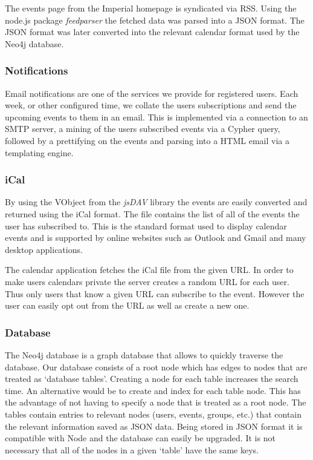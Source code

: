 \documentclass[11pt]{article}
\begin{document}
The events page from the Imperial homepage is syndicated via RSS. Using the node.js package \textit{feedparser} the fetched data was parsed into a JSON format. The JSON format was later converted into the relevant calendar format used by the Neo4j database.

\subsubsection{Notifications}
Email notifications are one of the services we provide for registered users. Each week, or other configured time, we collate the users subscriptions and send the upcoming events to them in an email. This is implemented via a connection to an SMTP server, a mining of the users subscribed events via a Cypher query, followed by a prettifying on the events and parsing into a HTML email via a templating engine.


\subsubsection{iCal}

By using the VObject from the \textit{jsDAV} library the events are easily converted and returned using the iCal format. The file contains the list of all of the events the user has subscribed to. This is the standard format used to display calendar events and is supported by online websites such as Outlook and Gmail and many desktop applications.

The calendar application fetches the iCal file from the given URL. In order to make users calendars private the server creates a random URL for each user. Thus only users that know a given URL can subscribe to the event. However the user can easily opt out from the URL as well as create a new one.

\subsubsection{Database}

The Neo4j database is a graph database that allows to quickly traverse the database.
Our database consists of a root node which has edges to nodes that are treated as `database tables'.
Creating a node for each table increases the search time. An alternative would be to create and index for each table node. This has the advantage of not having to specify a node that is treated as a root node.
The tables contain entries to relevant nodes (users, events, groups, etc.) that contain the relevant information saved as JSON data. Being stored in JSON format it is compatible with Node and the database can easily be upgraded. It is not necessary that all of the nodes in a given `table' have the same keys.
\end{document}
